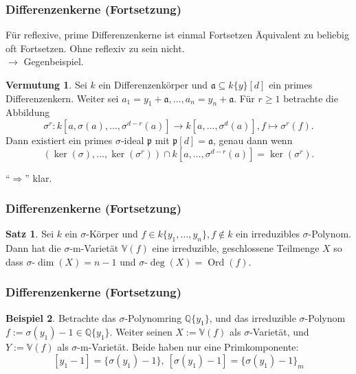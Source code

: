 \documentclass{beamer}
\def\Q{\mathbb{Q}}
\def\Q{\mathbb{Q}}
\def\VV{\mathbb{V}}
\def\a{\mathfrak{a}}
\def\p{\mathfrak{p}}
\def\s{\sigma}
\theoremstyle{definition}
\newtheorem{satz}{Satz}[section]
\newtheorem{conj}{Vermutung}[section]
\newtheorem{ex}[satz]{Beispiel}
\begin{document}
\begin{frame}\frametitle{Differenzenkerne (Fortsetzung)}
Für reflexive, prime Differenzenkerne ist einmal Fortsetzen Äquivalent zu beliebig oft Fortsetzen. Ohne reflexiv zu sein nicht. \\
$\rightarrow$ Gegenbeispiel. 
\begin{conj}
Sei $k$ ein Differenzenkörper und $\a \subseteq k\{y\}[d]$ ein primes Differenzenkern.
Weiter sei $a_1 = y_1 + \a ,\ldots,a_n = y_n + \a$.
Für $r \geq 1$ betrachte die Abbildung 
\[ \s^r : k[a,\s(a),\ldots,\s^{d-r}(a)] \rightarrow k[a,\ldots,\s^{d}(a)], f \mapsto \s^r(f). \]
Dann existiert ein primes $\s$-ideal $\p$ mit $\p[d] = \a$, genau dann wenn
\begin{equation*} (\operatorname{ker}(\s),\ldots,\operatorname{ker}(\s^r)) \cap k[a,\ldots,\s^{d-r}(a)] = \operatorname{ker}(\s^r). \end{equation*}
\end{conj}
``$\Rightarrow$'' klar.
\end{frame}

\begin{frame}\frametitle{Differenzenkerne (Fortsetzung)}
\begin{satz}\label{corfinal}
Sei $k$ ein $\s$-Körper und $f \in k\{y_1,\ldots,y_n\}, f \notin k$ ein irreduzibles $\s$-Polynom.
Dann hat die $\s$-m-Varietät $\VV(f)$ eine irreduzible, geschlossene Teilmenge $X$ so dass $\s$-$\dim(X) = n-1$ und $\s$-$\operatorname{deg}(X) = \operatorname{Ord}(f)$.
\end{satz}
\end{frame}


\begin{frame}\frametitle{Differenzenkerne (Fortsetzung)}
\begin{ex}
Betrachte das $\s$-Polynomring $\Q\{y_1\}$, und das irreduzible $\s$-Polynom $f := \s(y_1) - 1 \in \Q\{y_1\}$.  
Weiter seinen $X:= \VV(f)$ als $\s$-Varietät, und $Y:= \VV(f)$ als $\s$-m-Varietät. Beide haben nur eine Primkomponente:
$$[y_1 -1 ] = \{ \s(y_1) - 1 \},~ [\s(y_1) -1 ] = \{ \s(y_1) - 1 \}_m$$ 
\end{ex}
\end{frame}
\end{document}
